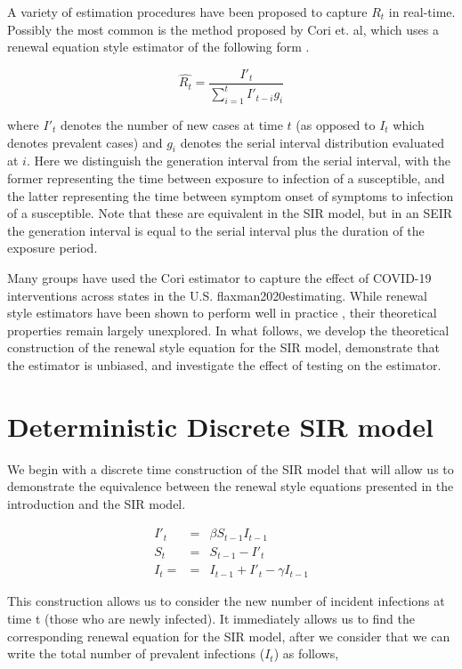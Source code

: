 \documentclass{umassthesis}          %
\begin{document}
A variety of estimation procedures have been proposed to capture $R_t$ in real-time. Possibly the most common is the method proposed by Cori et. al, which uses a renewal equation style estimator of the following form \cite{cori2013new}. 

\begin{equation}
\hat{R_t} = \frac{I'_t}{\sum_{i=1}^t I'_{t-i} g_i}
\end{equation}
 
 
 where $I'_t$ denotes the number of new cases at time $t$ (as opposed to $I_t$ which denotes prevalent cases) and $g_i$ denotes the serial interval distribution evaluated at $i$. Here we distinguish the generation interval from the serial interval, with the former representing the time between exposure to infection of a susceptible, and the latter representing the time between symptom onset of symptoms to infection of a susceptible. Note that these are equivalent in the SIR model, but in an SEIR the generation interval is equal to the serial interval plus the duration of the exposure period. 
 
 Many groups have used the Cori estimator to capture the effect of COVID-19 interventions across states in the U.S. \cite{gostic2020practical}{flaxman2020estimating}. While renewal style estimators have been shown to perform well in practice \cite{gostic2020practical}, their theoretical properties remain largely unexplored. In what follows, we develop the theoretical construction of the renewal style equation for the SIR model, demonstrate that the estimator is unbiased, and investigate the effect of testing on the estimator.  
 
 \section{Deterministic Discrete SIR model}
We begin with a discrete time construction of the SIR model that will allow us to demonstrate the equivalence between the renewal style equations presented in the introduction and the SIR model.

\begin{eqnarray}
I'_t &=& \beta S_{t-1} I_{t-1} \\
S_t &=& S_{t-1} - I'_{t}\\
I_t = &=& I_{t-1} + I'_t - \gamma I_{t-1}
\end{eqnarray}


This construction allows us to consider the new number of incident infections at time t (those who are newly infected). It immediately allows us to find the corresponding renewal equation for the SIR model, after we consider that we can write the total number of prevalent infections ($I_t$) as follows,
\end{document}
